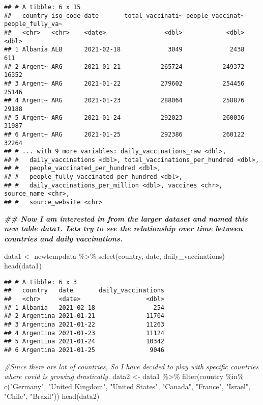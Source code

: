 \documentclass[
]{article}
\newenvironment{Shaded}{\begin{snugshade}}{\end{snugshade}}
\newcommand{\CommentTok}[1]{\textcolor[rgb]{0.56,0.35,0.01}{\textit{#1}}}
\newcommand{\DocumentationTok}[1]{\textcolor[rgb]{0.56,0.35,0.01}{\textbf{\textit{#1}}}}
\newcommand{\FunctionTok}[1]{\textcolor[rgb]{0.00,0.00,0.00}{#1}}
\newcommand{\NormalTok}[1]{#1}
\newcommand{\OtherTok}[1]{\textcolor[rgb]{0.56,0.35,0.01}{#1}}
\newcommand{\SpecialCharTok}[1]{\textcolor[rgb]{0.00,0.00,0.00}{#1}}
\newcommand{\StringTok}[1]{\textcolor[rgb]{0.31,0.60,0.02}{#1}}
\begin{document}
\begin{verbatim}
## # A tibble: 6 x 15
##   country iso_code date       total_vaccinati~ people_vaccinat~ people_fully_va~
##   <chr>   <chr>    <date>                <dbl>            <dbl>            <dbl>
## 1 Albania ALB      2021-02-18             3049             2438              611
## 2 Argent~ ARG      2021-01-21           265724           249372            16352
## 3 Argent~ ARG      2021-01-22           279602           254456            25146
## 4 Argent~ ARG      2021-01-23           288064           258876            29188
## 5 Argent~ ARG      2021-01-24           292023           260036            31987
## 6 Argent~ ARG      2021-01-25           292386           260122            32264
## # ... with 9 more variables: daily_vaccinations_raw <dbl>,
## #   daily_vaccinations <dbl>, total_vaccinations_per_hundred <dbl>,
## #   people_vaccinated_per_hundred <dbl>,
## #   people_fully_vaccinated_per_hundred <dbl>,
## #   daily_vaccinations_per_million <dbl>, vaccines <chr>, source_name <chr>,
## #   source_website <chr>
\end{verbatim}

\begin{Shaded}
\begin{Highlighting}[]
\DocumentationTok{\#\# Now I am interested in from the larger dataset and named this new table \textquotesingle{}data1\textquotesingle{}. Lets try to see the relationship over time between countries and daily vaccinations.}

\NormalTok{data1 }\OtherTok{\textless{}{-}}\NormalTok{ newtempdata }\SpecialCharTok{\%\textgreater{}\%}
  \FunctionTok{select}\NormalTok{(country, date, daily\_vaccinations)}
\FunctionTok{head}\NormalTok{(data1)}
\end{Highlighting}
\end{Shaded}

\begin{verbatim}
## # A tibble: 6 x 3
##   country   date       daily_vaccinations
##   <chr>     <date>                  <dbl>
## 1 Albania   2021-02-18                254
## 2 Argentina 2021-01-21              11704
## 3 Argentina 2021-01-22              11263
## 4 Argentina 2021-01-23              11124
## 5 Argentina 2021-01-24              10342
## 6 Argentina 2021-01-25               9046
\end{verbatim}

\begin{Shaded}
\begin{Highlighting}[]
\CommentTok{\#Since there are lot of countries, So I have decided to play with specific countries where covid is growing drastically. }
\NormalTok{data2 }\OtherTok{\textless{}{-}}\NormalTok{ data1 }\SpecialCharTok{\%\textgreater{}\%}
  \FunctionTok{filter}\NormalTok{(country }\SpecialCharTok{\%in\%} \FunctionTok{c}\NormalTok{(}\StringTok{"Germany"}\NormalTok{, }\StringTok{"United Kingdom"}\NormalTok{, }\StringTok{"United States"}\NormalTok{, }\StringTok{"Canada"}\NormalTok{, }\StringTok{"France"}\NormalTok{, }\StringTok{"Israel"}\NormalTok{, }\StringTok{"Chile"}\NormalTok{, }\StringTok{"Brazil"}\NormalTok{))}
\FunctionTok{head}\NormalTok{(data2)}
\end{Highlighting}
\end{Shaded}
\end{document}

